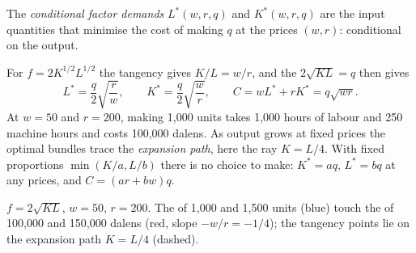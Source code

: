 \begin{definition}\label{def:b1:cost-minimisation:conditional-demand}
The \emph{conditional factor demands} $L^*(w, r, q)$ and $K^*(w, r, q)$ are the
input quantities that minimise the cost of making $q$ at the prices
$(w, r)$: conditional on the output.
\end{definition}

For $f = 2K^{1/2}L^{1/2}$ the tangency gives $K/L = w/r$, and the 
$2\sqrt{KL} = q$ then gives
\[
L^* = \frac q2\sqrt{\frac rw},\qquad K^* = \frac q2\sqrt{\frac wr},\qquad C = wL^* + rK^* = q\sqrt{wr}.
\]
At $w = 50$ and $r = 200$, making 1,000 units takes 1,000 hours of labour and
250 machine hours and costs 100,000 dalens. As output grows at fixed prices
the optimal bundles trace the \emph{expansion path}, here the ray
$K = L/4$. With fixed proportions $\min(K/a, L/b)$ there is no choice to make:
$K^* = aq$, $L^* = bq$ at any prices, and $C = (ar + bw)q$.

\begin{omfigure}

{\small $f = 2\sqrt{KL}$, $w = 50$, $r = 200$. The  of 1,000 and 1,500 units
(blue) touch the  of 100,000 and 150,000 dalens (red, slope
$-w/r = -1/4$); the tangency points lie on the expansion path $K = L/4$ (dashed).}
\end{omfigure}

